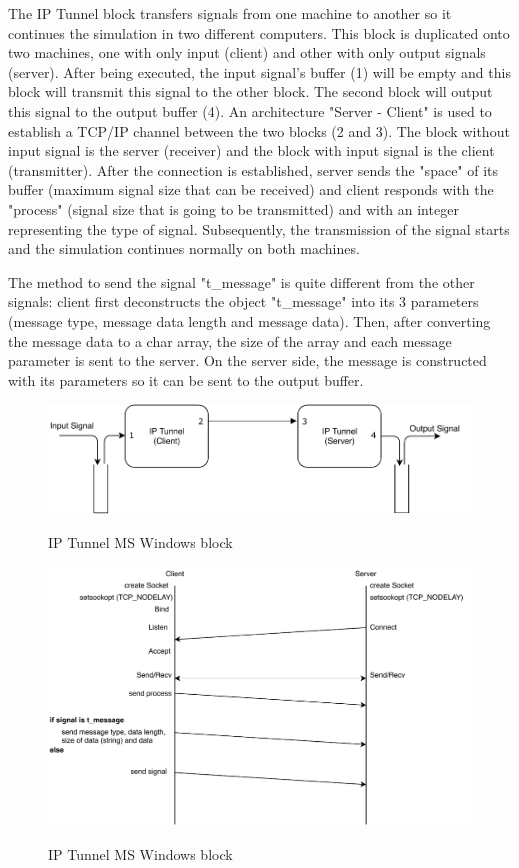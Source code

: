 The IP Tunnel block transfers signals from one machine to another so it continues the simulation in two different computers. This block is duplicated onto two machines, one with only input (client) and other with only output signals (server). After being executed, the input signal's buffer (1) will be empty and this block will transmit this signal to the other block. The second block will output this signal to the output buffer (4). An architecture "Server - Client" is used to establish a TCP/IP channel between the two blocks (2 and 3). The block without input signal is the server (receiver) and the block with input signal is the client (transmitter). After the connection is established, server sends the "space" of its buffer (maximum signal size that can be received) and client responds with the "process" (signal size that is going to be transmitted) and with an integer representing the type of signal. Subsequently, the transmission of the signal starts and the simulation continues normally on both machines.

The method to send the signal "t\_message" is quite different from the other signals: client first deconstructs the object "t\_message" into its 3 parameters (message type, message data length and message data). Then, after converting the message data to a char array, the size of the array and each message parameter is sent to the server. On the server side, the message is constructed with its parameters so it can be sent to the output buffer.

\begin{figure}[h]
	\centering
	\includegraphics[width=1.0\textwidth]{./lib/ip_tunnel_ms_windows/figures/StructureTCPIP4.pdf}
	\label{IP Tunnel Block}\caption{IP Tunnel MS Windows block}
\end{figure}

\begin{figure}[h]
	\centering
	\includegraphics{./lib/ip_tunnel_ms_windows/figures/FluxogramIPTunnel.pdf}
	\label{IP Tunnel Block}\caption{IP Tunnel MS Windows block}
\end{figure}